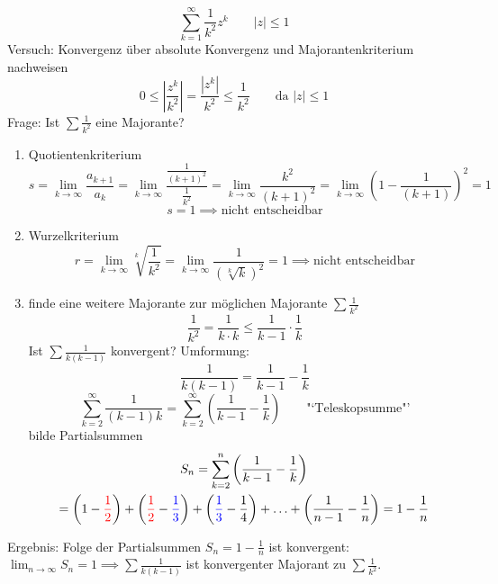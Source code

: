 \begin{example}
	\[
		\sum_{k=1}^\infty \frac{1}{k^2}z^k \qquad |z|\leq1
	\]
	Versuch: Konvergenz über absolute Konvergenz und Majorantenkriterium nachweisen
	\[
		0 \leq \left|\frac{z^k}{k^2}\right|=\frac{|z^k|}{k^2}\leq\frac{1}{k^2}\qquad \text{da } |z|\leq1
	\]
	Frage: Ist \( \sum\frac{1}{k^2} \) eine Majorante?
	
	\begin{enumerate}
		\item Quotientenkriterium 
		\[
		   s=\lim_{k\rightarrow\infty}\frac{a_{k+1}}{a_k}
			=\lim_{k\rightarrow\infty}\frac{\frac{1}{(k+1)^2}}{\frac{1}{k^2}}
			=\lim_{k\rightarrow\infty}\frac{k^2}{(k+1)^2}
			=\lim_{k\rightarrow\infty}\left(1-\frac{1}{(k+1)}\right)^2 
			= 1 
		\]
		\[
			s = 1 \implies \text{nicht entscheidbar} 
		\]
		\item Wurzelkriterium
		\[
		   r=\lim_{k\rightarrow\infty}\sqrt[k]{\frac{1}{k^2}}
			=\lim_{k\rightarrow\infty}\frac{1}{(\sqrt[k]{k})^2}
			= 1 \implies  \text{nicht entscheidbar}
		\]
		\item finde eine weitere Majorante zur möglichen Majorante \( \sum\frac{1}{k^2} \)
		\[
			\frac{1}{k^2}= \frac{1}{k\cdot k}\leq \frac{1}{k-1}\cdot\frac{1}{k}
		\]
		Ist \( \sum\frac{1}{k(k-1)} \) konvergent? Umformung:
		\[
			\frac{1}{k(k-1)}=\frac{1}{k-1}-\frac{1}{k}
		\]
		\[
			\sum_{k=2}^\infty\frac{1}{(k-1)k}=\sum_{k=2}^\infty\left(\frac{1}{k-1}-\frac{1}{k}\right) \qquad \text{"`Teleskopsumme"'}
		\]
		bilde Partialsummen
		\begin{multline*}
			S_n=\sum_{k=2}^n\left(\frac{1}{k-1}-\frac{1}{k}\right)\\=\left(1-{\color{red}\frac{1}{2}}\right)+\left({\color{red}\frac{1}{2}}-{\color{blue}\frac{1}{3}}\right)+\left({\color{blue}\frac{1}{3}}-\frac{1}{4}\right)+\ldots+\left(\frac{1}{n-1}-\frac{1}{n}\right)=1-\frac{1}{n}
		\end{multline*}
	\end{enumerate}
	Ergebnis: Folge der Partialsummen \( S_n = 1- \frac{1}{n}\) ist konvergent: \( \lim_{n\rightarrow\infty} S_n=1 \implies \sum\frac{1}{k(k-1)} \) ist konvergenter Majorant zu \( \sum\frac{1}{k^2} \).
\end{example}




